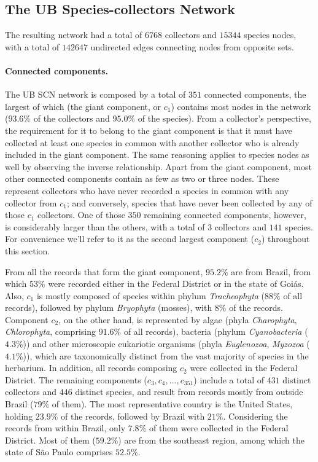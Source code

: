 \subsection{The UB Species-collectors Network}

The resulting network had a total of $6768$ collectors and $15344$ species nodes, with a total of $142647$ undirected edges connecting nodes from opposite sets. 

\paragraph*{Connected components.}
The UB SCN network is composed by a total of $351$ connected components, the largest of which (the giant component, or $c_1$) contains most nodes in the network ($93.6\%$ of the collectors and $95.0\%$ of the species). 
From a collector's perspective, the requirement for it to belong to the giant component is that it must have collected at least one species in common with another collector who is already included in the giant component. The same reasoning applies to species nodes as well by observing the inverse relationship.
Apart from the giant component, most other connected components contain as few as two or three nodes. These represent collectors who have never recorded a species in common with any collector from $c_1$; and conversely, species that have never been collected by any of those $c_1$ collectors.
One of those $350$ remaining connected components, however, is considerably larger than the others, with a total of $3$ collectors and $141$ species. For convenience we'll refer to it as the second largest component ($c_2$) throughout this section.

From all the records that form the giant component, $95.2\%$ are from Brazil, from which $53\%$ were recorded either in the Federal District or in the state of Goiás. 
Also, $c_1$ is mostly composed of species within phylum \textit{Tracheophyta} ($88\%$ of all records), followed by phylum \textit{Bryophyta} (mosses), with $8\%$ of the records. 
Component $c_2$, on the other hand, is represented by algae (phyla \textit{Charophyta}, \textit{Chlorophyta}, comprising $91.6\%$ of all records), bacteria (phylum \textit{Cyanobacteria} ($4.3\%$)) and other microscopic eukariotic organisms (phyla \textit{Euglenozoa}, \textit{Myzozoa} ($4.1\%$)), which are taxonomically distinct from the vast majority of species in the herbarium.
In addition, all records composing $c_2$ were collected in the Federal District.
The remaining components ($c_3,c_4,..., c_{351}$) include a total of $431$ distinct collectors and $446$ distinct species, and result from records mostly from outside Brazil ($79\%$ of them).
The most representative country is the United States, holding $23.9\%$ of the records, followed by Brazil with $21\%$. 
Considering the records from within Brazil, only $7.8\%$ of them were collected in the Federal District. Most of them ($59.2\%$) are from the southeast region, among which the state of São Paulo comprises $52.5\%$.


